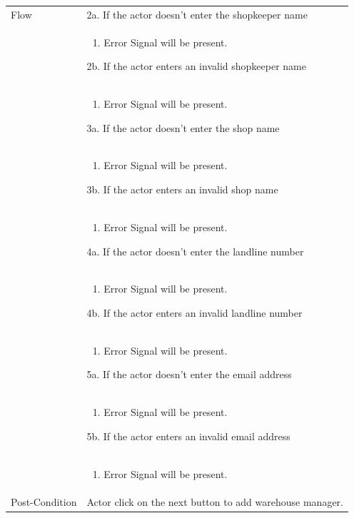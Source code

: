 \documentclass[12pt,a4paper]{report}
\begin{document}
\begin{tabular}{ | m{3cm} | m{12cm}| } \hline
Flow & 
2a. If the actor doesn't enter the shopkeeper name \\ 	
&	\begin{enumerate}
		\item Error Signal will be present.
	\end{enumerate}
2b. If the actor enters an invalid shopkeeper name \\ 	
&	\begin{enumerate}
		\item Error Signal will be present.
	\end{enumerate}
3a. If the actor doesn't enter the shop name \\ 	
&	\begin{enumerate}
		\item Error Signal will be present.
	\end{enumerate}
3b. If the actor enters an invalid shop name \\ 	
&	\begin{enumerate}
		\item Error Signal will be present.
	\end{enumerate}
4a. If the actor doesn't enter the landline number \\ 	
&	\begin{enumerate}
		\item Error Signal will be present.
	\end{enumerate}
4b. If the actor enters an invalid landline number\\ 	
&	\begin{enumerate}
		\item Error Signal will be present.
	\end{enumerate}
5a. If the actor doesn't enter the email address \\ 	
&	\begin{enumerate}
		\item Error Signal will be present.
	\end{enumerate}
5b. If the actor enters an invalid email address\\ 	
&	\begin{enumerate}
		\item Error Signal will be present.
	\end{enumerate}
\\ \hline
Post-Condition & Actor click on the next button to add warehouse manager.  \\\hline
\end{tabular}
\end{document}
